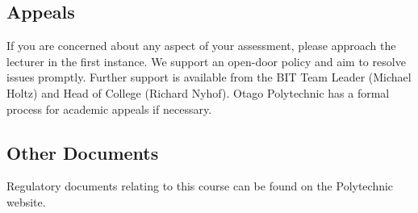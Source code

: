 \documentclass{article}
\begin{document}
\subsection*{Appeals}
If you are concerned about any aspect of your assessment, please approach the lecturer in the first instance. We support an open-door policy and aim to resolve issues promptly. Further support is available from the BIT Team Leader (Michael Holtz) and Head of College (Richard Nyhof). Otago Polytechnic has a formal process for academic appeals if necessary.

\subsection*{Other Documents}
Regulatory documents relating to this course can be found on the Polytechnic website.
\end{document}
